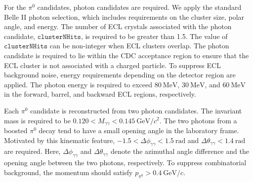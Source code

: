 For the $\pi^{0}$ candidates, photon candidates are required.
We apply the standard Belle II photon selection, which includes requirements on the cluster size, polar angle, and energy.
The number of ECL crystals associated with the photon candidate, $\texttt{clusterNHits}$, is required to be greater than 1.5.
The value of $\texttt{clusterNHits}$ can be non-integer when ECL clusters overlap.
The photon candidate is required to lie within the CDC acceptance region to ensure that the ECL cluster is not associated with a charged particle.
To suppress ECL background noise, energy requirements depending on the detector region are applied.
The photon energy is required to exceed $80~\textrm{MeV}$, $30~\textrm{MeV}$, and $60~\textrm{MeV}$ in the forward, barrel, and backward ECL regions, respectively.

Each $\pi^0$ candidate is reconstructed from two photon candidates.
The invariant mass is required to be $0.120 < M_{\gamma \gamma} < 0.145~\textrm{GeV}/c^{2}$.
The two photons from a boosted $\pi^0$ decay tend to have a small opening angle in the laboratory frame.
Motivated by this kinematic feature, $-1.5<\Delta\phi_{\gamma\gamma}<1.5~\textrm{rad}$ and $\Delta\theta_{\gamma\gamma}<1.4~\textrm{rad}$ are required.
Here, $\Delta\phi_{\gamma\gamma}$ and $\Delta\theta_{\gamma\gamma}$ denote the azimuthal angle difference and the opening angle between the two photons, respectively.
To suppress combinatorial background, the momentum should satisfy $p_{\pi^{0}} > 0.4~\textrm{GeV}/c$.

